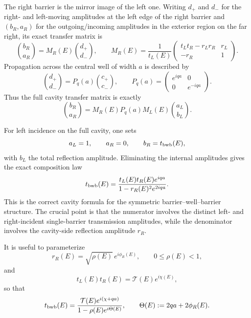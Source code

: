 \documentclass[aps,pra,preprint,notitlepage,nofootinbib]{revtex4-2}
\begin{document}
The right barrier is the mirror image of the left one. Writing $d_+$ and $d_-$ for the right- and left-moving amplitudes at the left edge of the right barrier and $(b_R,a_R)$ for the outgoing/incoming amplitudes in the exterior region on the far right, its exact transfer matrix is
\begin{equation}
\binom{b_R}{a_R}
=
M_R(E)
\binom{d_+}{d_-},
\qquad
M_R(E)=\frac{1}{t_L(E)}
\begin{pmatrix}
t_L t_R-r_L r_R & r_L \\
-r_R & 1
\end{pmatrix}.
\label{eq:MR-def}
\end{equation}
Propagation across the central well of width $a$ is described by
\begin{equation}
\binom{d_+}{d_-}
=
P_q(a)
\binom{c_+}{c_-},
\qquad
P_q(a)=
\begin{pmatrix}
e^{iqa} & 0 \\
0 & e^{-iqa}
\end{pmatrix}.
\label{eq:Pq-def}
\end{equation}
Thus the full cavity transfer matrix is exactly
\begin{equation}
\binom{b_R}{a_R}=M_R(E)P_q(a)M_L(E)\binom{a_L}{b_L}.
\label{eq:full-bwb-transfer}
\end{equation}

For left incidence on the full cavity, one sets
\begin{equation}
a_L=1,
\qquad
a_R=0,
\qquad
b_R=t_{\rm bwb}(E),
\label{eq:left-inc-cavity}
\end{equation}
with $b_L$ the total reflection amplitude. Eliminating the internal amplitudes gives the exact composition law
\begin{equation}
t_{\rm bwb}(E)=
\frac{t_L(E)t_R(E)e^{iqa}}
{1-r_R(E)^2 e^{2iqa}}.
\label{eq:t-bwb-exact}
\end{equation}
This is the correct cavity formula for the symmetric barrier--well--barrier structure. The crucial point is that the numerator involves the distinct left- and right-incident single-barrier transmission amplitudes, while the denominator involves the cavity-side reflection amplitude $r_R$.

It is useful to parameterize
\begin{equation}
r_R(E)=\sqrt{\rho(E)}\,e^{i\phi_R(E)},
\qquad
0\le \rho(E)<1,
\label{eq:rR-polar}
\end{equation}
and
\begin{equation}
t_L(E)t_R(E)=\mathcal T(E)e^{i\chi(E)},
\label{eq:tLtR-polar}
\end{equation}
so that
\begin{equation}
t_{\rm bwb}(E)=
\frac{\mathcal T(E)e^{i(\chi+qa)}}{1-\rho(E)e^{i\Theta(E)}},
\qquad
\Theta(E):=2qa+2\phi_R(E).
\label{eq:t-bwb-Theta-correct}
\end{equation}
\end{document}
